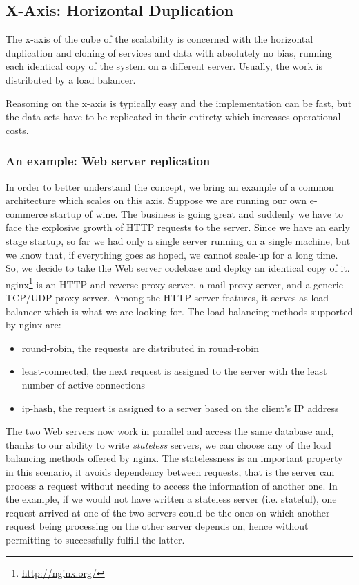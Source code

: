 \subsection{X-Axis: Horizontal Duplication}
\label{sec:x-axis}

The x-axis of the cube of the scalability is concerned with the horizontal
duplication and cloning of services and data with absolutely no bias, running
each identical copy of the system on a different server. Usually, the work is
distributed by a load balancer.

Reasoning on the x-axis is typically easy and the implementation can be fast,
but the data sets have to be replicated in their entirety which increases
operational costs.

\subsubsection{An example: Web server replication}
In order to better understand the concept, we bring an example of a common
architecture which scales on this axis. Suppose we are running our own
e-commerce startup of wine. The business is going great and suddenly we have to
face the explosive growth of HTTP requests to the server. Since we have an early
stage startup, so far we had only a single server running on a single machine,
but we know that, if everything goes as hoped, we cannot scale-up for a long
time. So, we decide to take the Web server codebase and deploy an identical copy
of it. nginx\footnote{\url{http://nginx.org/}} is an HTTP and reverse proxy
server, a mail proxy server, and a generic TCP/UDP proxy server. Among the HTTP
server features, it serves as load balancer which is what we are looking for.
The load balancing methods supported by nginx are:

\begin{itemize}
  \item round-robin, the requests are distributed in round-robin
  \item least-connected, the next request is assigned to the server with the
  least number of active connections
  \item ip-hash, the request is assigned to a server based on the client's IP
  address
\end{itemize}

The two Web servers now work in parallel and access the same database and,
thanks to our ability to write \emph{stateless} servers, we can choose any of
the load balancing methods offered by nginx. The statelessness is an important
property in this scenario, it avoids dependency between requests, that is the
server can process a request without needing to access the information of
another one. In the example, if we would not have written a stateless server
(i.e. stateful), one request arrived at one of the two servers could be the ones
on which another request being processing on the other server depends on, hence
without permitting to successfully fulfill the latter.

